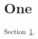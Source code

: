 \documentclass{article}
\begin{document}
\section{One}\label{one}
Section~\ref{one}.
\end{document}

